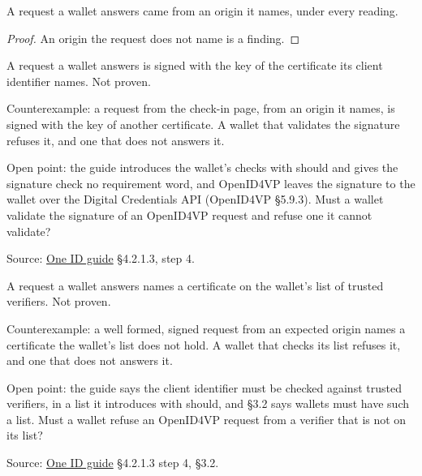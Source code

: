 \begin{theorem}
  \label{thm:openid4vp-answered}
  A request a wallet answers came from an origin it names, under every
  reading.
\end{theorem}
\begin{proof}
  An origin the request does not name is a finding.
\end{proof}

\begin{theorem}
  \label{thm:openid4vp-answered-signed}
  A request a wallet answers is signed with the key of the certificate its
  client identifier names.  Not proven.

  Counterexample: a request from the check-in page, from an origin it names,
  is signed with the key of another certificate.  A wallet that validates the
  signature refuses it, and one that does not answers it.

  Open point: the guide introduces the wallet's checks with should and gives
  the signature check no requirement word, and OpenID4VP leaves the signature
  to the wallet over the Digital Credentials API (OpenID4VP §5.9.3).  Must a
  wallet validate the signature of an OpenID4VP request and refuse one it
  cannot validate?

  Source: \href{https://standards.atlassian.net/wiki/spaces/OneID/pages/2947416082/Technical+Implementation+Guide}{One ID guide} §4.2.1.3, step 4.
\end{theorem}

\begin{theorem}
  \label{thm:openid4vp-answered-trusted}
  A request a wallet answers names a certificate on the wallet's list of
  trusted verifiers.  Not proven.

  Counterexample: a well formed, signed request from an expected origin names
  a certificate the wallet's list does not hold.  A wallet that checks its
  list refuses it, and one that does not answers it.

  Open point: the guide says the client identifier must be checked against
  trusted verifiers, in a list it introduces with should, and §3.2 says
  wallets must have such a list.  Must a wallet refuse an OpenID4VP request
  from a verifier that is not on its list?

  Source: \href{https://standards.atlassian.net/wiki/spaces/OneID/pages/2947416082/Technical+Implementation+Guide}{One ID guide} §4.2.1.3 step 4, §3.2.
\end{theorem}

